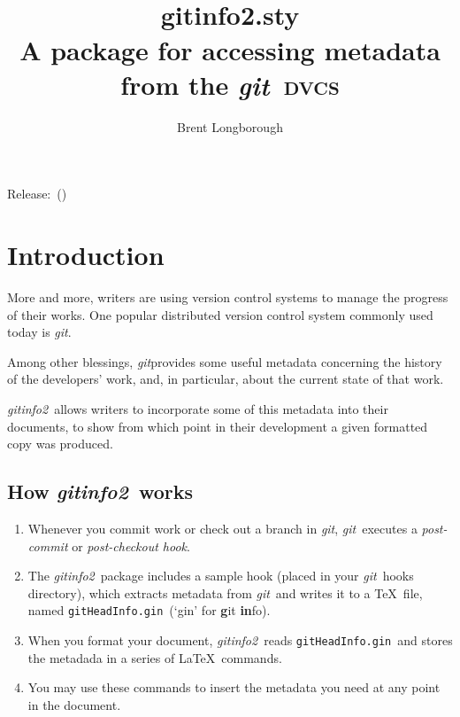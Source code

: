 \documentclass[a4paper,12pt,twoside,openany]{memoir}
\newcommand{\sfit}[1]{\textit{#1}}
\newcommand{\git}{\sfit{git}}
\newcommand{\tpname}{\sfit{gitinfo2}}
\newcommand{\tpfname}{\textsf{gitinfo2.sty}}
\newcommand{\ginname}{gitHeadInfo.gin}
\newcommand{\metaname}{\texttt{\ginname}}
\begin{document}
\frontmatter
\title{%
	~\\[2\baselineskip]
	\Huge \tpfname\\[2ex]%
	\Large A package for accessing metadata\\from the \git\ \textsc{dvcs}
	}
\author{Brent Longborough}
\date{ }
\maketitle

{\centering
Release:\gitReln\ (\gitAbbrevHash)\\
}
\thispagestyle{empty}
\clearforchapter
\tableofcontents*
\mainmatter
\pagestyle{giruled}
\chapter{Introduction}
More and more, writers are using version control systems
to manage the progress of their works.
One popular distributed version control system commonly used today
is \git.

Among other blessings, \git provides
some useful metadata concerning the history of the developers'
work, and, in particular, about the current state of that work.

\tpname\ allows writers to incorporate some of this metadata
into their documents, to show from which point in their development
a given formatted copy was produced.

\section{How \tpname\ works}
\begin{enumerate}
\item Whenever you commit work or check out a branch in \git,
\git\ executes a \textit{post-commit} or \textit{post-checkout hook}.

\item The \tpname\ package includes a sample hook
(placed in your \git\ hooks directory),
which extracts metadata from \git\ and writes it to a \TeX\ file,
named \metaname\ (`gin' for \textbf{g}it \textbf{in}fo).

\item When you format your document, \tpname\ reads
\metaname\ and stores the metadada
in a series of \LaTeX\ commands.

\item You may use these commands to insert
the metadata you need at any point in the document.
\end{enumerate}
\end{document}
